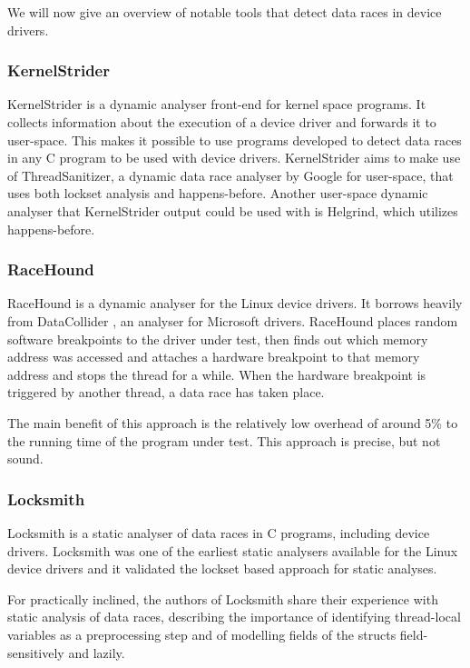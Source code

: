 \documentclass[..thesis.tex]{subfiles}
\begin{document}
We will now give an overview of notable tools that detect data races in device drivers.

\subsubsection{KernelStrider}

KernelStrider\cite{shatokhin_kernel_????} is a dynamic analyser front-end for kernel space programs.
It collects information about the execution of a device driver and forwards it to user-space.
This makes it possible to use programs developed to detect data races in any C program to be used with device drivers.
KernelStrider aims to make use of ThreadSanitizer\cite{serebryany_threadsanitizer:_2009}, a dynamic data race analyser by Google for user-space,
that uses both lockset analysis and happens-before. Another user-space dynamic analyser that KernelStrider output could be used with is Helgrind,
\cite{_helgrind_????,nethercote_valgrind:_2007} which utilizes happens-before.

\subsubsection{RaceHound}

RaceHound\cite{komarov_implementation_2013} is a dynamic analyser for the Linux device drivers.
It borrows heavily from DataCollider \cite{erickson_effective_2010}, an analyser for Microsoft drivers.
RaceHound places random software breakpoints to the driver under test,
then finds out which memory address was accessed and attaches a hardware breakpoint to that memory address and stops the thread for a while.
When the hardware breakpoint is triggered by another thread, a data race has taken place.

The main benefit of this approach is the relatively low overhead of around 5\% to the running time of the program under test.
This approach is precise, but not sound.

\subsubsection{Locksmith}
Locksmith\cite{pratikakis_locksmith:_2006} is a static analyser of data races in C programs, including device drivers.
Locksmith was one of the earliest static analysers available for the Linux device drivers and it validated the lockset based approach for static analyses. 

For practically inclined, the authors of Locksmith share their experience with static analysis of data races,
describing the importance of identifying thread-local variables as a preprocessing step and of modelling fields of the structs field-sensitively and lazily\cite{pratikakis_locksmith:_2011}.
\end{document}
